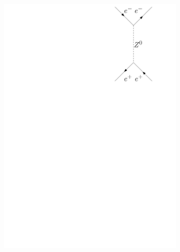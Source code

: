 \documentclass[11pt, a4paper]{article}
\numberwithin{equation}{section}
\begin{document}
\begin{figure}[htb]
\begin{subfigure}{.32\textwidth}
		\includegraphics[width=.9\textwidth]{./figures/theory/feynman/ee_t}
	\end{subfigure}
	\begin{subfigure}{.32\textwidth}
		\centering

\end{subfigure}
\end{figure}
\end{document}
